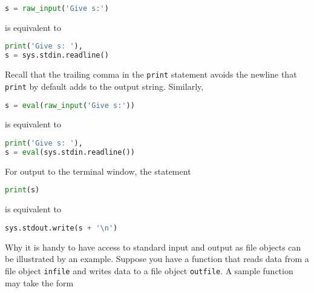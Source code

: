 \documentclass[graybox,sectrefs,envcountresetchap,open=right,final]{svmonodo}
\begin{document}
\begin{lstlisting}[language=Python,style=simple,xleftmargin=2mm]
s = raw_input('Give s:')

\end{lstlisting}

is equivalent to




\begin{lstlisting}[language=Python,style=simple,xleftmargin=2mm]
print('Give s: '),
s = sys.stdin.readline()

\end{lstlisting}

Recall that the trailing comma in the \texttt{print} statement avoids the
newline that \texttt{print} by default adds to the output string.
Similarly,



\begin{lstlisting}[language=Python,style=simple,xleftmargin=2mm]
s = eval(raw_input('Give s:'))

\end{lstlisting}

is equivalent to




\begin{lstlisting}[language=Python,style=simple,xleftmargin=2mm]
print('Give s: '),
s = eval(sys.stdin.readline())

\end{lstlisting}

For output to the terminal window, the statement



\begin{lstlisting}[language=Python,style=simple,xleftmargin=2mm]
print(s)

\end{lstlisting}

is equivalent to



\begin{lstlisting}[language=Python,style=simple,xleftmargin=2mm]
sys.stdout.write(s + '\n')

\end{lstlisting}


Why it is handy to have access to standard input and output
as file objects can be illustrated by an example. Suppose you have a
function that reads data from a file object \texttt{infile}
and writes data to a file object \texttt{outfile}.
A sample function may take the form
\end{document}
